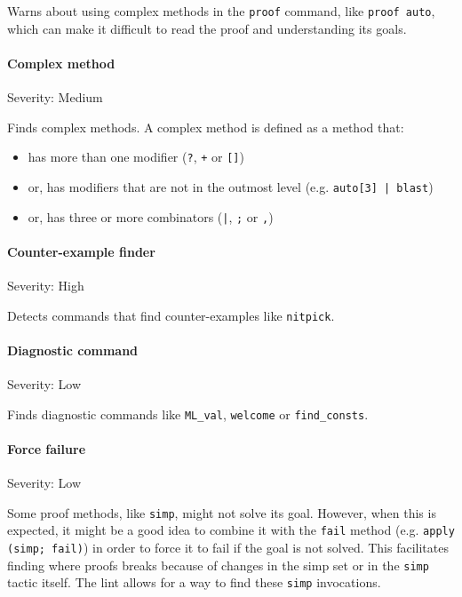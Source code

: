 Warns about using complex methods in the \texttt{proof} command, like 
\texttt{proof auto}, which can make it difficult to read the proof and 
understanding its goals.

\paragraph{Complex method}\label{lint:complexmethod}
Severity: Medium

Finds complex methods. A complex method is defined as a method that:

\begin{itemize}
    \item has more than one modifier (\texttt{?}, \texttt{+} or \texttt{[]})
    \item or, has modifiers that are not in the outmost level (e.g. \texttt{auto[3] | blast})
    \item or, has three or more combinators (\texttt{|}, \texttt{;} or \texttt{,}) 
\end{itemize}


\paragraph{Counter-example finder}\label{lint:counterexample}
Severity: High

Detects commands that find counter-examples like \texttt{nitpick}.

\paragraph{Diagnostic command}
Severity: Low

Finds diagnostic commands like \texttt{ML\_val}, \texttt{welcome} or 
\texttt{find\_consts}.

\paragraph{Force failure}
Severity: Low

Some proof methods, like \texttt{simp}, might not solve its goal. However, when
this is expected, it might be a good idea to combine it with the
\texttt{fail} method (e.g. \texttt{apply (simp; fail)}) in order to force it to fail
if the goal is not solved. This facilitates finding where proofs breaks because of
changes in the simp set or in the \texttt{simp} tactic itself.
The lint allows for a way to find these \texttt{simp} invocations.


